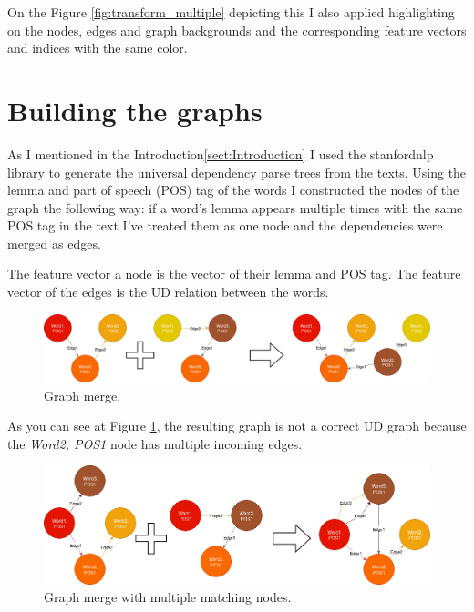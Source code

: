 On the Figure \ref{fig:transform_multiple} depicting this I also applied highlighting on the nodes, edges and graph backgrounds and the corresponding feature vectors and indices with the same color.

\FloatBarrier
\section{Building the graphs}

As I mentioned in the Introduction\ref{sect:Introduction} I used the stanfordnlp library to generate the universal dependency parse trees from the texts. Using the lemma and part of speech (POS) tag of the words I constructed the nodes of the graph the following way: if a word's lemma appears multiple times with the same POS tag in the text I've treated them as one node and the dependencies were merged as edges.

The feature vector a node is the vector of their lemma and POS tag. The feature vector of the edges is the UD relation between the words.

\begin{figure}[!ht]
	\centering
	\includegraphics[width=150mm, keepaspectratio]{figures/merge_graphs_color.png}
	\caption{Graph merge.}
	\label{fig:merge_graph_color}
\end{figure}

As you can see at Figure \ref{fig:merge_graph_color}, the resulting graph is not a correct UD graph because the \textit{Word2, POS1} node has multiple incoming edges.

\begin{figure}[!ht]
	\centering
	\includegraphics[width=150mm, keepaspectratio]{figures/merge_graphs_color_multiple.png}
	\caption{Graph merge with multiple matching nodes.}
	\label{fig:merge_graph_color_multiple}
\end{figure}

